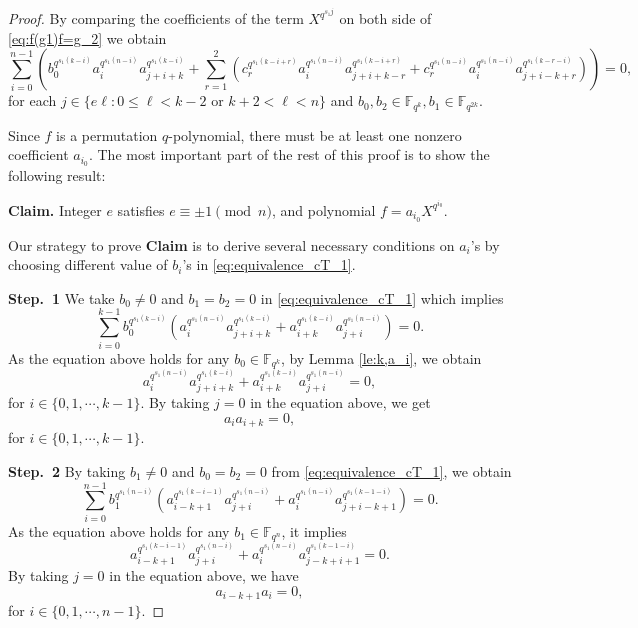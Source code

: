 \documentclass{amsart}
\theoremstyle{plain}
\theoremstyle{definition}
\newcommand{\fqn}{\mathbb{F}_{q^n}}
\newcommand{\fqk}{\mathbb{F}_{q^k}}
\begin{document}
\begin{proof}
		By comparing the coefficients of the term $X^{q^{s_1j}}$ on both side of \eqref{eq:f(g1)f=g_2} we obtain
		\begin{equation}\label{eq:equivalence_cT_1}
			\sum_{i = 0}^{n - 1} \left( b_0^{q^{s_1(k - i)}} a_i^{q^{s_1(n - i)}} a_{j + i+k}^{q^{s_1(k - i)}}  + \sum_{r = 1}^{2} \left( c_r^{q^{s_1(k - i +r)}} a_i^{q^{s_1(n - i)}} a_{j + i + k-r}^{q^{s_1(k - i+r)}} + c_r^{q^{s_1(n - i)}} a_i^{q^{s_1(n - i)}} a_{j + i - k+r}^{q^{s_1(k-r - i)}} \right) \right)=0,
		\end{equation}
		for each $j\in\{e\ell: 0\leq \ell < k-2\text{ or  }k+2< \ell <n\}$ and $b_0,b_2\in\mathbb{F}_{q^{k}},b_1\in\mathbb{F}_{q^{2k}}$.
		
		Since $f$ is a permutation $q$-polynomial, there must be at least one nonzero coefficient $a_{i_0}$. The most important part of the rest of this proof is to show the following result:
		
		\textbf{Claim.}
		Integer $e$ satisfies $e \equiv \pm 1\pmod{n}$, and polynomial $f=a_{i_0}X^{q^{i_0}}$.
		
		
		Our strategy to prove \textbf{Claim} is to derive several necessary conditions on  $a_i$'s by choosing different value of $b_i$'s in \eqref{eq:equivalence_cT_1}.
		
		\textbf{Step.\ 1}  We take $b_0\neq 0$ and $b_1=b_2 = 0$ in \eqref{eq:equivalence_cT_1} which implies
		\begin{equation*}
			\sum_{i=0}^{k-1}b_0^{q^{s_1(k - i)}}(a_i^{q^{s_1(n - i)}} a_{j + i+k}^{q^{s_1(k - i)}} +a_{i+k}^{q^{s_1(k - i)}} a_{j + i}^{q^{s_1(n - i)}})=0.
		\end{equation*}
		As the equation above holds for any $b_0\in\fqk$,  by Lemma \ref{le:k,a_i}, we obtain
		\begin{equation}\label{equi:2_1}
			a_i^{q^{s_1(n - i)}} a_{j + i+k}^{q^{s_1(k - i)}} +a_{i+k}^{q^{s_1(k - i)}} a_{j + i}^{q^{s_1(n - i)}}=0,
		\end{equation}
		for $i\in\{0,1,\cdots, k-1\}$.
		By taking $j= 0$ in the equation above, we get
		\begin{equation}\label{equi:2_2}
			a_ia_{i+k}=0,
		\end{equation}
		for $i\in\{0,1,\cdots, k-1\}$.
		
		\textbf{Step.\ 2}  By taking $b_1\neq 0$ and $b_0=b_2 = 0$ from \eqref{eq:equivalence_cT_1}, we obtain
		\begin{equation*}
			\sum_{i=0}^{n-1}b_1^{q^{s_1(n - i)}}(a_{i-k+1}^{q^{s_1(k-i-1)}} a_{j + i}^{q^{s_1(n - i)}} +a_i^{q^{s_1(n - i)}} a_{j + i - k+1}^{q^{s_1(k-1 - i)}})=0.
		\end{equation*}
		As the  equation above holds for any $b_1\in\fqn$,  it implies
		\begin{equation}\label{equi:3_1}
			a_{i-k+1}^{q^{s_1(k-i-1)}} a_{j + i}^{q^{s_1(n - i)}} +a_i^{q^{s_1(n - i)}} a_{j -k+ i+1}^{q^{s_1(k-1 - i)}}=0.
		\end{equation}
		By taking $j= 0$ in the equation above, we have 
		\begin{equation}\label{equi:3_2}
			a_{i-k+1} a_{i}=0,
		\end{equation}
		for $i\in\{0,1,\cdots, n-1\}$.
		

\end{proof}
\end{document}
